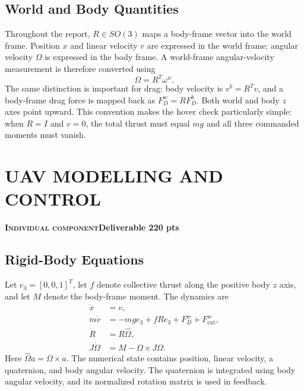\documentclass[letterpaper,10pt,conference]{ieeeconf}
\newcommand{\deliverablebar}[3]{%
  \vspace{-0.35em}\noindent
  \colorbox{softblue}{\parbox{\dimexpr\columnwidth-2\fboxsep\relax}{%
    \scriptsize\color{navy}\bfseries\textsc{#1}\hfill #2\hfill #3}}%
  \par\vspace{0.45em}}
\begin{document}
\subsection{World and Body Quantities}
Throughout the report, $R\in SO(3)$ maps a body-frame vector into the world frame. Position $x$ and linear velocity $v$ are expressed in the world frame; angular velocity $\Omega$ is expressed in the body frame. A world-frame angular-velocity measurement is therefore converted using
\begin{equation}
\Omega=R^T\omega^w.
\label{eq:omega}
\end{equation}
The same distinction is important for drag: body velocity is $v^b=R^Tv$, and a body-frame drag force is mapped back as $F_D^w=RF_D^b$. Both world and body $z$ axes point upward. This convention makes the hover check particularly simple: when $R=I$ and $v=0$, the total thrust must equal $mg$ and all three commanded moments must vanish.

\section{UAV MODELLING AND CONTROL}
\deliverablebar{Individual component}{Deliverable 2}{20 pts}
\subsection{Rigid-Body Equations}
Let $e_3=[0,0,1]^T$, let $f$ denote collective thrust along the positive body $z$ axis, and let $M$ denote the body-frame moment. The dynamics are
\begin{align}
\dot x &= v,\\
m\dot v &= -mg e_3+fRe_3+F_D^w+F_{\mathrm{ext}}^w,\label{eq:translation}\\
\dot R &= R\widehat\Omega,\\
J\dot\Omega &= M-\Omega\times J\Omega.\label{eq:rotation}
\end{align}
Here $\widehat\Omega a=\Omega\times a$. The numerical state contains position, linear velocity, a quaternion, and body angular velocity. The quaternion is integrated using body angular velocity, and its normalized rotation matrix is used in feedback.
\end{document}
